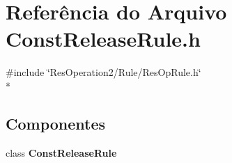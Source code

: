 \section{Referência do Arquivo Const\+Release\+Rule.\+h}
\label{_2_rule_2_const_release_2_const_release_rule_8h}
{\ttfamily \#include \char`\"{}Res\+Operation2/\+Rule/\+Res\+Op\+Rule.\+h\char`\"{}}\\*
\subsection*{Componentes}
\begin{DoxyCompactItemize}
\item 
class {\bf Const\+Release\+Rule}
\end{DoxyCompactItemize}
